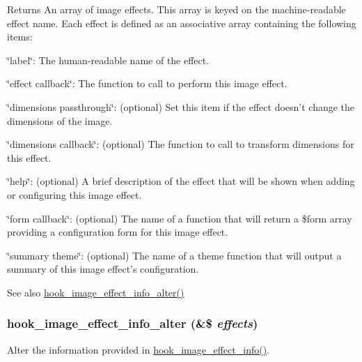 \begin{DoxyReturn}{Returns}
An array of image effects. This array is keyed on the machine-\/readable effect name. Each effect is defined as an associative array containing the following items:
\begin{DoxyItemize}
\item \char`\"{}label\char`\"{}: The human-\/readable name of the effect.
\item \char`\"{}effect callback\char`\"{}: The function to call to perform this image effect.
\item \char`\"{}dimensions passthrough\char`\"{}: (optional) Set this item if the effect doesn't change the dimensions of the image.
\item \char`\"{}dimensions callback\char`\"{}: (optional) The function to call to transform dimensions for this effect.
\item \char`\"{}help\char`\"{}: (optional) A brief description of the effect that will be shown when adding or configuring this image effect.
\item \char`\"{}form callback\char`\"{}: (optional) The name of a function that will return a \$form array providing a configuration form for this image effect.
\item \char`\"{}summary theme\char`\"{}: (optional) The name of a theme function that will output a summary of this image effect's configuration.
\end{DoxyItemize}
\end{DoxyReturn}
\begin{DoxySeeAlso}{See also}
\hyperlink{group__hooks_gaf48ed66489194afdf3e5bce6b3e28768}{hook\_\-image\_\-effect\_\-info\_\-alter()} 
\end{DoxySeeAlso}
\hypertarget{group__hooks_gaf48ed66489194afdf3e5bce6b3e28768}{
\subsubsection[{hook\_\-image\_\-effect\_\-info\_\-alter}]{\setlength{\rightskip}{0pt plus 5cm}hook\_\-image\_\-effect\_\-info\_\-alter (\&\$ {\em effects})}}
\label{group__hooks_gaf48ed66489194afdf3e5bce6b3e28768}
Alter the information provided in \hyperlink{group__hooks_ga9681816aeb01a316e98457b40a01f8ed}{hook\_\-image\_\-effect\_\-info()}.


